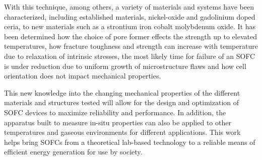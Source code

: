 With this technique, among others, a variety of materials and systems have been characterized, including established materials, nickel-oxide and gadolinium doped ceria, to new materials such as a strontium iron cobalt molybdenum oxide.
It has been determined how the choice of pore former effects the strength up to elevated temperatures, how fracture toughness and strength can increase with temperature due to relaxation of intrinsic stresses, the most likely time for failure of an SOFC is under reduction due to uniform growth of microstructure flaws and how cell orientation does not impact mechanical properties.

This new knowledge into the changing mechanical properties of the different materials and structures tested will allow for the design and optimization of SOFC devices to maximize reliability and performance.
In addition, the apparatus built to measure in-situ properties can also be applied to other temperatures and gaseous environments for different applications.
This work helps bring SOFCs from a theoretical lab-based technology to a reliable means of efficient energy generation for use by society.
